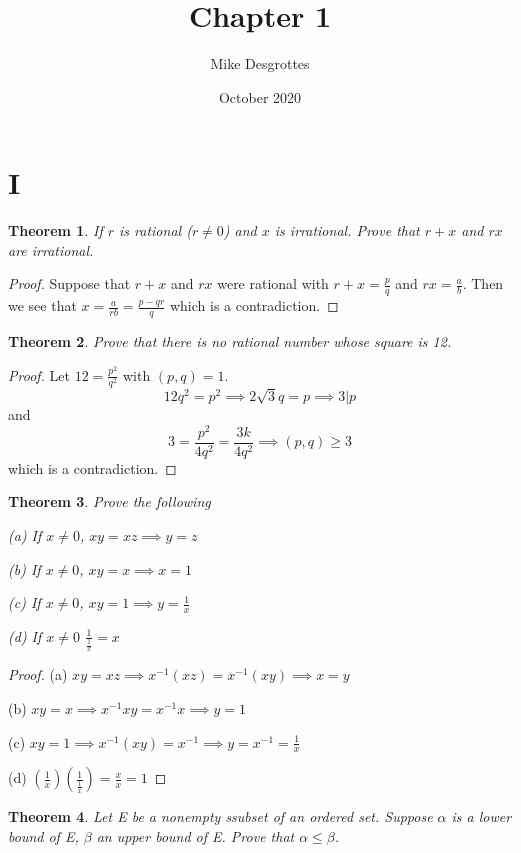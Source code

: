 \documentclass{article}
\title{Chapter 1}
\author{Mike Desgrottes}
\date{October 2020}
\theoremstyle{plain}
\newtheorem{theorem}{Theorem}
\theoremstyle{definition}
\begin{document}
\maketitle

\section{I}
\begin{theorem}
	If $r$ is rational ($r \not = 0$) and $x$ is irrational. Prove that $r + x$ and $rx$ are irrational.
\end{theorem}

\begin{proof}
	Suppose that $r + x$ and $rx$ were rational with $r + x = \frac{p}{q}$ and $rx = \frac{a}{b}$. Then we see that $x = \frac{a}{rb} = \frac{p - qr}{q}$ which is a contradiction.
\end{proof}

\begin{theorem}
	Prove that there is no rational number whose square is 12.
\end{theorem}
\begin{proof}
	Let $12 = \frac{p^{2}}{q^{2}}$ with $(p,q) = 1$. $$12q^{2} = p^{2} \implies 2\sqrt{3}q = p \implies 3 | p $$ and $$3 = \frac{p^{2}}{4q^{2}} = \frac{3k}{4q^{2}} \implies (p,q) \geq  3 $$ which is a contradiction.
\end{proof}

\begin{theorem}
	Prove the following

	(a) If $x \not = 0$, $xy = xz \implies y = z$

	(b) If $x \not = 0$, $xy = x \implies x = 1$

	(c) If $x \not = 0$, $xy = 1 \implies y = \frac{1}{x}$

	(d) If $x \not = 0$ $\frac{1}{\frac{1}{x}} = x$
\end{theorem}

\begin{proof}
	(a) $xy = xz \implies x^{-1}(xz) = x^{-1}(xy) \implies x = y$

	(b) $xy = x \implies x^{-1}xy = x^{-1}x \implies y = 1$

	(c) $xy = 1 \implies x^{-1}(xy) = x^{-1} \implies y = x^{-1} = \frac{1}{x}$

	(d) $(\frac{1}{x})(\frac{1}{\frac{1}{x}}) = \frac{x}{x} = 1$
\end{proof}

\begin{theorem}
	Let E be a nonempty ssubset of an ordered set. Suppose $\alpha$ is a lower bound of E, $\beta$ an upper bound of E. Prove that $\alpha \leq \beta$.
\end{theorem}
\end{document}
